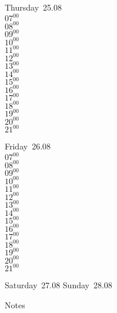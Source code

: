 \documentclass[11pt,a4paper]{book}\usepackage[]{graphicx}\usepackage[]{color}
\begin{document}
\clearpage
\begin{headerbox}
\end{headerbox}
\begin{weekdaybox}
  Thursday~25.08\\
  { 
  \vfill
  $07^{00}$\\
$08^{00}$\\
$09^{00}$\\
$10^{00}$\\
$11^{00}$\\
$12^{00}$\\
$13^{00}$\\
$14^{00}$\\
$15^{00}$\\
$16^{00}$\\
$17^{00}$\\
$18^{00}$\\
$19^{00}$\\
$20^{00}$\\
$21^{00}$\\
  }
\end{weekdaybox} 
\begin{weekdaybox}
  Friday~26.08\\
  { 
  \vfill
  $07^{00}$\\
$08^{00}$\\
$09^{00}$\\
$10^{00}$\\
$11^{00}$\\
$12^{00}$\\
$13^{00}$\\
$14^{00}$\\
$15^{00}$\\
$16^{00}$\\
$17^{00}$\\
$18^{00}$\\
$19^{00}$\\
$20^{00}$\\
$21^{00}$\\
  }
\end{weekdaybox}
\begin{weekendbox}
  Saturday~27.08
  \tcblower
  Sunday~28.08
\end{weekendbox} %
\begin{notebox}
  Notes
\end{notebox}
\clearpage
\end{document}
